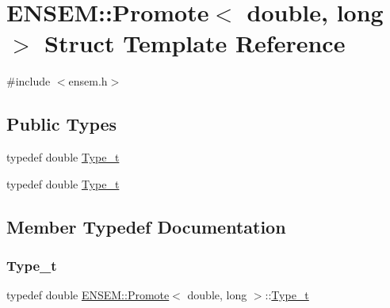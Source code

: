 \hypertarget{structENSEM_1_1Promote_3_01double_00_01long_01_4}{}\section{E\+N\+S\+EM\+:\+:Promote$<$ double, long $>$ Struct Template Reference}
\label{structENSEM_1_1Promote_3_01double_00_01long_01_4}


{\ttfamily \#include $<$ensem.\+h$>$}

\subsection*{Public Types}
\begin{DoxyCompactItemize}
\item 
typedef double \mbox{\hyperlink{structENSEM_1_1Promote_3_01double_00_01long_01_4_ab38f2aa99a29d60ef8d3393a5fe7d568}{Type\+\_\+t}}
\item 
typedef double \mbox{\hyperlink{structENSEM_1_1Promote_3_01double_00_01long_01_4_ab38f2aa99a29d60ef8d3393a5fe7d568}{Type\+\_\+t}}
\end{DoxyCompactItemize}


\subsection{Member Typedef Documentation}
\mbox{\label{structENSEM_1_1Promote_3_01double_00_01long_01_4_ab38f2aa99a29d60ef8d3393a5fe7d568}} 
\subsubsection{\texorpdfstring{Type\_t}{Type\_t}\hspace{0.1cm}{\footnotesize\ttfamily [1/2]}}
{\footnotesize\ttfamily typedef double \mbox{\hyperlink{structENSEM_1_1Promote}{E\+N\+S\+E\+M\+::\+Promote}}$<$ double, long $>$\+::\mbox{\hyperlink{structENSEM_1_1Promote_3_01double_00_01long_01_4_ab38f2aa99a29d60ef8d3393a5fe7d568}{Type\+\_\+t}}}

\mbox{\label{structENSEM_1_1Promote_3_01double_00_01long_01_4_ab38f2aa99a29d60ef8d3393a5fe7d568}} 
